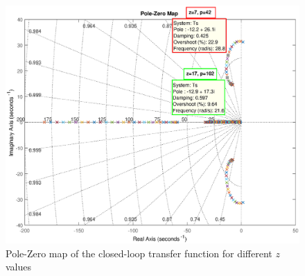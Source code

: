 \begin{figure}[thpb]
	\centering	
	\includegraphics[width=\linewidth]{./fig/Q01_A_pzmap.eps}
	\caption{Pole-Zero map of the closed-loop transfer function for different $z$ values}
	\label{fig:Q01_A_pzmap} 
\end{figure}


